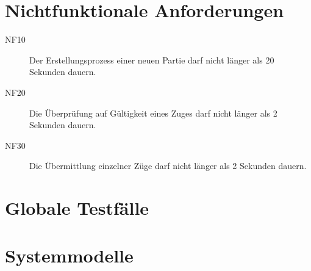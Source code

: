 \documentclass[parskip=full]{scrartcl}
\begin{document}
\section{Nichtfunktionale Anforderungen}
\begin{description}
	
	\item[NF10] Der Erstellungsprozess einer neuen Partie darf nicht länger als 20 Sekunden dauern.
	\item[NF20] Die Überprüfung auf Gültigkeit eines Zuges darf nicht länger als 2 Sekunden dauern.
	\item[NF30] Die Übermittlung einzelner Züge darf nicht länger als 2 Sekunden dauern.
	
\end{description}
\section{Globale Testfälle}
\section{Systemmodelle}
\end{document}
